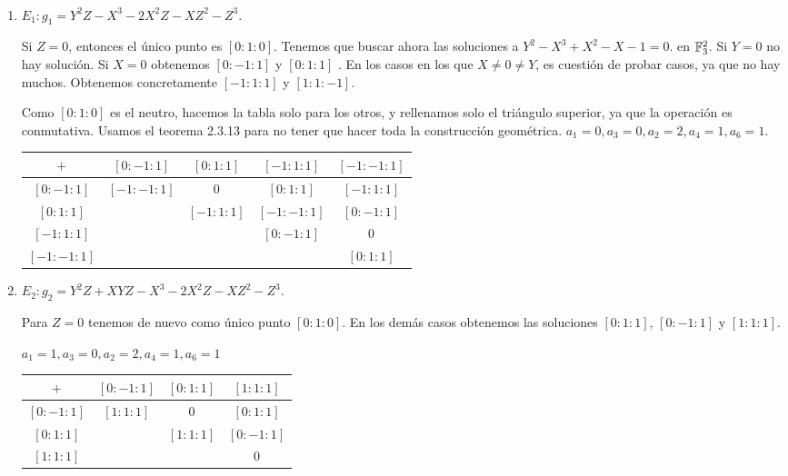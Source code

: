 \documentclass[twoside]{article}
\begin{document}
\begin{solucion}\
\begin{enumerate}
\item $E_1: g_1=Y^2Z-X^3-2X^2Z-XZ^2-Z^3$. 

Si $Z=0$, entonces el único punto es $[0:1:0]$. Tenemos que buscar ahora las soluciones a $Y^2-X^3+X^2-X-1=0$. en $\mathbb{F}_3^2$. Si $Y=0$ no hay solución. Si $X=0$ obtenemos $[0:-1:1]$ y $[0:1:1]$ . En los casos en los que $X\neq 0\neq Y$, es cuestión de probar casos, ya que no hay muchos. Obtenemos concretamente $[-1:1:1]$ y $[1:1:-1]$. 

Como $[0:1:0]$ es el neutro, hacemos la tabla solo para los otros, y rellenamos solo el triángulo superior, ya que la operación es conmutativa. Usamos el teorema 2.3.13 para no tener que hacer toda la construcción geométrica. $a_1=0,a_3=0,a_2=2,a_4=1,a_6=1$.

\begin{tabular}{|c||c|c|c|c|}
\hline
$+$ & $[0:-1:1]$ & $[0:1:1]$  & $[-1:1:1]$ & $[-1:-1:1]$\\
\hline
\hline
$[0:-1:1]$ &  $[-1:-1:1]$   &       0     &      $[0:1:1]$      &  $[-1:1:1]$\\
\hline
$[0:1:1]$  &      &        $[-1:1:1]$   &       $[-1:-1:1]$      & $[0:-1:1]$\\
\hline
$[-1:1:1]$ &       &         &         $[0:-1:1]$     & 0\\
\hline
$[-1:-1:1]$ &       &        &               &$[0:1:1]$\\
\hline
\end{tabular}

\item $E_2: g_2=Y^2Z + XYZ - X^3 - 2X^2Z - XZ^2 - Z^3$. 

Para $Z=0$ tenemos de nuevo como único punto $[0:1:0]$. En los demás casos obtenemos las soluciones $[0:1:1]$, $[0:-1:1]$ y $[1:1:1]$. 

$a_1=1,a_3=0,a_2=2,a_4=1,a_6=1$

\begin{tabular}{|c||c|c|c|}
\hline
$+$ & $[0:-1:1]$ & $[0:1:1]$  & $[1:1:1]$ \\
\hline
\hline
$[0:-1:1]$ &   $[1:1:1]$  &     0      &     $[0:1:1]$     \\
\hline
$[0:1:1]$  &      &       $[1:1:1]$    &   $[0:-1:1]$      \\
\hline
$[1:1:1]$ &       &         &      0    \\
\hline
\end{tabular}


\end{enumerate}
\end{solucion}
\end{document}

